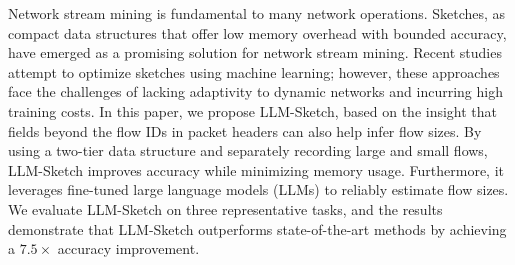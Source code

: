 Network stream mining is fundamental to many network operations. Sketches, as compact data structures that offer low memory overhead with bounded accuracy, have emerged as a promising solution for network stream mining. Recent studies attempt to optimize sketches using machine learning; however, these approaches face the challenges of lacking adaptivity to dynamic networks and incurring high training costs.
%
In this paper, we propose LLM-Sketch, based on the insight that fields beyond the flow IDs in packet headers can also help infer flow sizes. By using a two-tier data structure and separately recording large and small flows, LLM-Sketch improves accuracy while minimizing memory usage. Furthermore, it leverages fine-tuned large language models (LLMs) to reliably estimate flow sizes. We evaluate LLM-Sketch on three representative tasks, and the results demonstrate that LLM-Sketch outperforms state-of-the-art methods by achieving a \(7.5 \times\) accuracy improvement.

